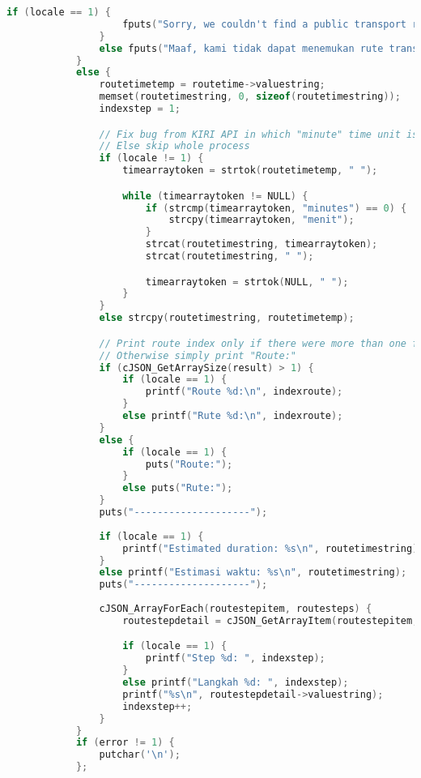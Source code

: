 \begin{itemize}[listparindent=\parindent]
\begin{lstlisting}[language=C, caption=Implementasi fungsi write\textunderscore findroute(), label=code:kiritool-function-write-findroute]
                if (locale == 1) {
                    fputs("Sorry, we couldn't find a public transport route for your trip.\n", stderr);
                }
                else fputs("Maaf, kami tidak dapat menemukan rute transportasi publik untuk perjalanan anda.\n", stderr);
            }
            else {
                routetimetemp = routetime->valuestring;
                memset(routetimestring, 0, sizeof(routetimestring));
                indexstep = 1;

                // Fix bug from KIRI API in which "minute" time unit is not translated in id
                // Else skip whole process
                if (locale != 1) {
                    timearraytoken = strtok(routetimetemp, " ");

                    while (timearraytoken != NULL) {
                        if (strcmp(timearraytoken, "minutes") == 0) {
                            strcpy(timearraytoken, "menit");
                        }
                        strcat(routetimestring, timearraytoken);
                        strcat(routetimestring, " ");

                        timearraytoken = strtok(NULL, " ");
                    }
                }
                else strcpy(routetimestring, routetimetemp);

                // Print route index only if there were more than one found
                // Otherwise simply print "Route:"
                if (cJSON_GetArraySize(result) > 1) {
                    if (locale == 1) {
                        printf("Route %d:\n", indexroute);
                    }
                    else printf("Rute %d:\n", indexroute);
                }
                else {
                    if (locale == 1) {
                        puts("Route:");
                    }
                    else puts("Rute:");
                }
                puts("--------------------");
                
                if (locale == 1) {
                    printf("Estimated duration: %s\n", routetimestring);
                }
                else printf("Estimasi waktu: %s\n", routetimestring);
                puts("--------------------");
                
                cJSON_ArrayForEach(routestepitem, routesteps) {
                    routestepdetail = cJSON_GetArrayItem(routestepitem, 3);

                    if (locale == 1) {
                        printf("Step %d: ", indexstep);
                    }
                    else printf("Langkah %d: ", indexstep);
                    printf("%s\n", routestepdetail->valuestring);
                    indexstep++;
                }
            }
            if (error != 1) {
                putchar('\n');
            };


\end{lstlisting}
\end{itemize}
